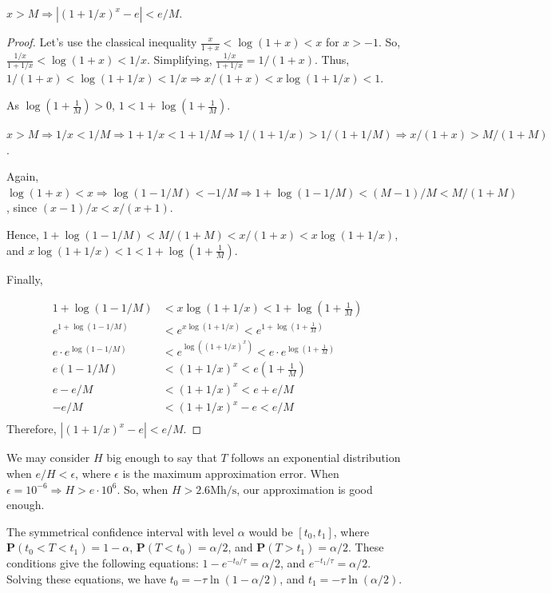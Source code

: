 \begin{theorem}
	$x > M \Rightarrow |(1+1/x)^x - e| < e/M$.
\end{theorem}
\begin{proof}
	Let's use the classical inequality $\frac{x}{1+x} < \log(1+x) < x$ for $x > -1$. So, $\frac{1/x}{1+1/x} < \log(1+x) < 1/x$. Simplifying, $\frac{1/x}{1+1/x} = 1/(1+x)$.  Thus, $1/(1+x) < \log(1+1/x) < 1/x \Rightarrow x/(1+x) < x \log(1 + 1/x) < 1$.

	As $\log(1 + \frac{1}{M}) > 0$, $1 < 1 + \log(1 + \frac{1}{M})$.

	$x > M \Rightarrow 1/x < 1/M \Rightarrow 1+1/x < 1+1/M \Rightarrow 1/(1+1/x) > 1/(1+1/M) \Rightarrow x/(1+x) > M/(1+M)$.

	Again, $\log(1+x) < x \Rightarrow \log(1-1/M) < -1/M \Rightarrow 1 + \log(1-1/M) < (M-1)/M < M/(1+M)$, since $(x-1)/x < x/(x+1)$.

	Hence, $1 + \log(1-1/M) < M/(1+M) < x/(1+x) < x\log(1+1/x)$, and $x\log(1+1/x) < 1 < 1 + \log(1 + \frac{1}{M})$.

	Finally,

	\begin{align*}
		1 + \log(1-1/M) &< x\log(1+1/x) < 1 + \log(1 + \frac{1}{M}) \\
		e^{1 + \log(1-1/M)} &< e^{x\log(1+1/x)} < e^{1 + \log(1 + \frac{1}{M})} \\
		e \cdot e^{\log(1-1/M)} &< e^{\log((1+1/x)^x)} < e \cdot e^{\log(1 + \frac{1}{M})} \\
		e(1-1/M) &< (1+1/x)^x < e(1 + \frac{1}{M}) \\
		e-e/M &< (1+1/x)^x < e + e/M \\
		-e/M &< (1+1/x)^x - e < e/M \\
	\end{align*}
	Therefore, $\left| \left( 1+1/x \right)^x - e \right| < e/M$.
\end{proof}

We may consider $H$ big enough to say that $T$ follows an exponential distribution when $e/H < \epsilon$, where $\epsilon$ is the maximum approximation error. When $\epsilon = 10^{-6} \Rightarrow H > e \cdot 10^6$. So, when $H > 2.6 \text{Mh/s}$, our approximation is good enough.

The symmetrical confidence interval with level $\alpha$ would be $[t_0, t_1]$, where $\mathbf{P}(t_0 < T < t_1) = 1-\alpha$, $\mathbf{P}(T<t_0) = \alpha/2$, and $\mathbf{P}(T>t_1) = \alpha/2$. These conditions give the following equations: $1 - e^{-t_0/\tau} = \alpha/2$, and $e^{-t_1/\tau} = \alpha/2$. Solving these equations, we have $t_0 = -\tau \ln{(1 - \alpha/2)}$, and $t_1 = -\tau \ln{(\alpha/2)}$.

